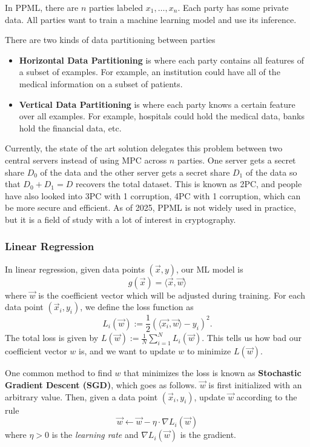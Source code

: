 In PPML, there are $n$ parties labeled $x_1, \dots, x_n$. Each party has some private data. All parties want to train a machine learning model and use its inference.

There are two kinds of data partitioning between parties
\begin{itemize}
    \item \textbf{Horizontal Data Partitioning} is where each party contains all features of a subset of examples. For example, an institution could have all of the medical information on a subset of patients.
    \item \textbf{Vertical Data Partitioning} is where each party knows a certain feature over all examples. For example, hospitals could hold the medical data, banks hold the financial data, etc.
\end{itemize}

Currently, the state of the art solution delegates this problem between two central servers instead of using MPC across $n$ parties. One server gets a secret share $D_0$ of the data and the other server gets a secret share $D_1$ of the data so that $D_0 + D_1 = D$ recovers the total dataset. This is known as 2PC, and people have also looked into 3PC with 1 corruption, 4PC with 1 corruption, which can be more secure and efficient. As of 2025, PPML is not widely used in practice, but it is a field of study with a lot of interest in cryptography.

\subsubsection{Linear Regression}

In linear regression, given data points $(\vec{x}, y)$, our ML model is 
$$g(\vec{x}) = \langle \vec{x}, \vec{w}\rangle$$
where $\vec{w}$ is the coefficient vector which will be adjusted during training. For each data point $(\vec{x}_i, y_i)$, we define the loss function as 
$$L_i(\vec{w}) := \frac{1}{2}(\langle \vec{x_i}, \vec{w}\rangle - y_i)^2.$$
The total loss is given by $L(\vec{w}):= \frac{1}{N}\sum_{i = 1}^{N} L_i (\vec{w})$. This tells us how bad our coefficient vector $w$ is, and we want to update $w$ to minimize $L(\vec{w})$.

One common method to find $w$ that minimizes the loss is known as \textbf{Stochastic Gradient Descent (SGD)}, which goes as follows. $\vec{w}$ is first initialized with an arbitrary value. Then, given a data point $(\vec{x}_i, y_i)$, update $\vec{w}$ according to the rule
$$\vec{w} \gets \vec{w} - \eta \cdot \nabla L_i(\vec{w})$$
where $\eta > 0$ is the \textit{learning rate} and $\nabla L_i(\vec{w})$ is the gradient.

